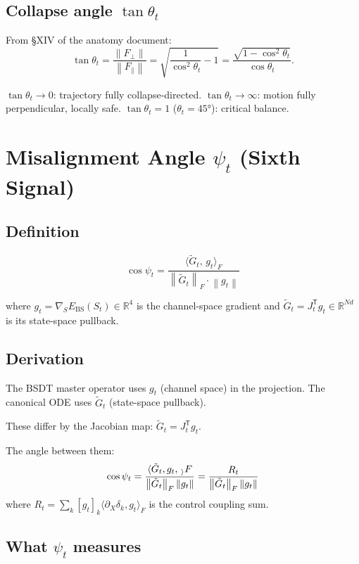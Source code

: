 \documentclass[11pt,a4paper]{article}
\theoremstyle{definition}
\newcommand{\R}{\mathbb{R}}
\newcommand{\T}{^{\mathsf{T}}}
\newcommand{\norm}[1]{\left\|#1\right\|}
\newcommand{\inner}[2]{\langle #1,\,#2\rangle}
\begin{document}
\subsection{Collapse angle $\tan\theta_t$}

From §XIV of the anatomy document:
\[
\tan\theta_t = \frac{\norm{F_\perp}}{\norm{F_\parallel}} = \sqrt{\frac{1}{\cos^2\theta_t} - 1} = \frac{\sqrt{1-\cos^2\theta_t}}{\cos\theta_t}.
\]

$\tan\theta_t \to 0$: trajectory fully collapse-directed.
$\tan\theta_t \to \infty$: motion fully perpendicular, locally safe.
$\tan\theta_t = 1$ ($\theta_t = 45°$): critical balance.

\section{Misalignment Angle $\psi_t$ (Sixth Signal)}

\subsection{Definition}

\begin{lockedbox}
\[
\cos\psi_t = \frac{\inner{\tilde G_t}{g_t}_F}{\norm{\tilde G_t}_F\cdot\norm{g_t}}
\]
\end{lockedbox}

where $g_t = \nabla_S E_\mathrm{BS}(S_t) \in \R^4$ is the channel-space gradient
and $\tilde G_t = J_t\T g_t \in \R^{Nd}$ is its state-space pullback.

\subsection{Derivation}

The BSDT master operator uses $g_t$ (channel space) in the projection.
The canonical ODE uses $\tilde G_t$ (state-space pullback).

These differ by the Jacobian map: $\tilde G_t = J_t\T g_t$.

The angle between them:
\[
\cos\psi_t = \frac{\inner{\tilde G_t, g_t}_F}{\norm{\tilde G_t}_F\norm{g_t}}
= \frac{R_t}{\norm{\tilde G_t}_F\norm{g_t}}
\]
where $R_t = \sum_k [g_t]_k\langle\partial_X\delta_k, g_t\rangle_F$ is the control coupling sum.

\subsection{What $\psi_t$ measures}
\end{document}

